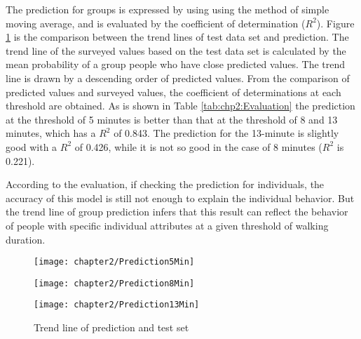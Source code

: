 The prediction for groups is expressed by using using the method of simple moving average, and is evaluated by the coefficient of determination ($R^2$). Figure \ref{fig:chp2:Prediction} is the comparison between the trend lines of test data set and prediction. The trend line of the surveyed values based on the test data set is calculated by the mean probability of a group people who have close predicted values. The trend line is drawn by a descending order of predicted values. From the comparison of predicted values and surveyed values, the coefficient of determinations at each threshold are obtained. As is shown in Table \ref{tab:chp2:Evaluation} the prediction at the threshold of 5 minutes is better than that at the threshold of 8 and 13 minutes, which has a $R^2$ of 0.843. The prediction for the 13-minute is slightly good with a $R^2$ of 0.426, while it is not so good in the case of 8 minutes ($R^2$ is 0.221). 

According to the evaluation, if checking the prediction for individuals, the accuracy of this model is still not enough to explain the individual behavior. But the trend line of group prediction infers that this result can reflect the behavior of people with specific individual attributes at a given threshold of walking duration. 

\begin{figure}[htbp]
	\centering
	\begin{minipage}{0.49\linewidth}
		\centering
		\texttt{[image: chapter2/Prediction5Min]} \\
		\label{note:tab:chp2:Prediction5}
	\end{minipage}
	\hfill %
	\begin{minipage}{0.49\linewidth}
		\centering
		\texttt{[image: chapter2/Prediction8Min]} \\
		\label{note:tab:chp2:Prediction8}
	\end{minipage}
	
	\vfill %
	\begin{minipage}{0.49\linewidth}
		\centering
		\texttt{[image: chapter2/Prediction13Min]} \\
		\label{note:tab:chp2:Prediction13}
	\end{minipage}

	\caption{Trend line of prediction and test set}
	\label{fig:chp2:Prediction}
\end{figure}

